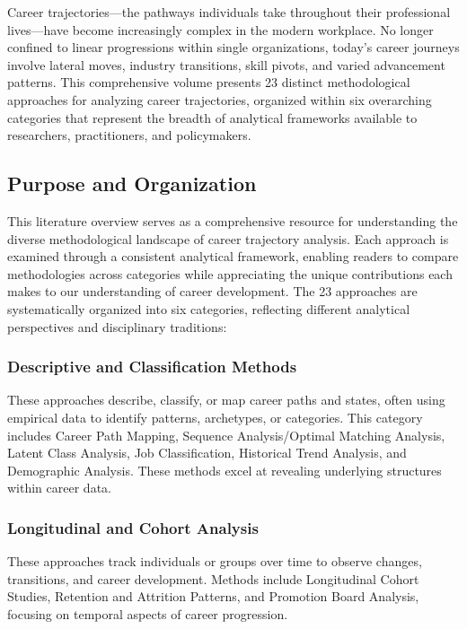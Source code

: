 \documentclass[./main.tex]{subfiles}
\begin{document}
\doublespacing
Career trajectories---the pathways individuals take throughout their professional lives---have become increasingly complex in the modern workplace. No longer confined to linear progressions within single organizations, today's career journeys involve lateral moves, industry transitions, skill pivots, and varied advancement patterns. This comprehensive volume presents 23 distinct methodological approaches for analyzing career trajectories, organized within six overarching categories that represent the breadth of analytical frameworks available to researchers, practitioners, and policymakers.

\subsection{Purpose and Organization}\label{purpose-and-organization}
This literature overview serves as a comprehensive resource for
understanding the diverse methodological landscape of career trajectory analysis. Each approach is examined through a consistent analytical framework, enabling readers to compare methodologies across categories while appreciating the unique contributions each makes to our understanding of career development. The 23 approaches are systematically organized into six categories, reflecting different analytical perspectives and disciplinary traditions:

\subsubsection{Descriptive and Classification Methods}\label{descriptive-and-classification-methods}
These approaches describe, classify, or map career paths and states, often using empirical data to identify patterns, archetypes, or categories. This category includes Career Path Mapping, Sequence Analysis/Optimal Matching Analysis, Latent Class Analysis, Job Classification, Historical Trend Analysis, and Demographic Analysis. These methods excel at revealing underlying structures within career data.

\subsubsection{Longitudinal and Cohort
Analysis}\label{longitudinal-and-cohort-analysis}
These approaches track individuals or groups over time to observe changes, transitions, and career development. Methods include Longitudinal Cohort Studies, Retention and Attrition Patterns, and Promotion Board Analysis, focusing on temporal aspects of career progression.
\end{document}
